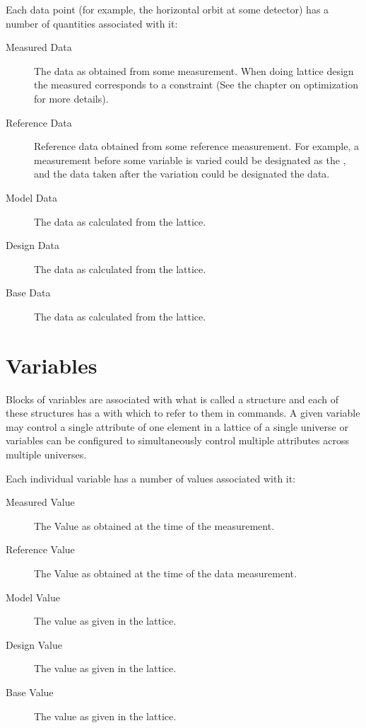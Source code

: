 Each data point (for example, the horizontal orbit at some
detector) has a number of quantities associated with it:
  \vspace*{-3ex}
  \begin{description}
  \item[Measured Data] \Newline 
The data as obtained from some measurement.
When doing lattice design the measured  corresponds to
a constraint (See the chapter on optimization for more details).
  \item[Reference Data] \Newline
Reference data obtained from some reference measurement. For example,
a measurement before some variable is varied could be designated as
the , and the data taken after the variation could be 
designated the  data.
  \item[Model Data] \Newline
The data as calculated from the  lattice.
  \item[Design Data] \Newline
The data as calculated from the  lattice.
  \item[Base Data] \Newline
The data as calculated from the  lattice.
  \end{description}

\section{Variables}

Blocks of variables are associated with what is called a
 structure and each of these structures has a 
with which to refer to them in \tao commands. A given variable may
control a single attribute of one element in a  lattice
of a single universe or variables can be configured to simultaneously
control multiple attributes across multiple universes.

Each individual variable has a number of values associated with it:
  \vspace*{-3ex}
  \begin{description}
  \item[Measured Value] \Newline
The Value as obtained at the time of the  measurement.
  \item[Reference Value] \Newline
The Value as obtained at the time of the  data  measurement.
  \item[Model Value] \Newline
The value as given in the  lattice.
  \item[Design Value] \Newline
The value as given in the  lattice.
  \item[Base Value] \Newline
The value as given in the  lattice.
  \end{description}

